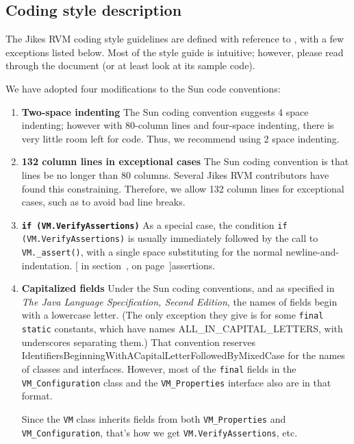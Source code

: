 \subsection{Coding style description}

The Jikes\TMweb{} RVM coding style guidelines are defined with
reference to ,
with a few exceptions listed below.  Most of the style guide is intuitive; 
however, please read through the document (or at least look at its sample code).

We have adopted four modifications to the Sun code conventions:
\begin{enumerate}
\item {\bf Two-space indenting} The Sun coding convention suggests 4
space indenting; however with 80-column lines and four-space indenting,
there is very little room left for code.  Thus, we recommend using 2
space indenting.

\item {\bf 132 column lines in exceptional cases} The Sun coding convention is
that lines be no longer than 80 columns.  Several Jikes RVM
contributors have found this constraining.  Therefore, we allow 132
column lines for exceptional cases, such as to avoid bad line breaks.

\item {\bf \tt if (VM.VerifyAssertions)}
As a special case, the condition {\tt if (VM.VerifyAssertions)} is
usually immediately followed by the call to {\tt VM.\_assert()},
with a single space substituting for the normal
newline-and-indentation.  [ in section~\Ref, on page~\Pageref]{assertions}.    

\item {\bf Capitalized fields} 
Under the Sun coding conventions, and as specified in 
{\em The Java Language Specification, Second Edition}, the names of
fields begin with a lowercase letter.  (The only exception they give
is for some {\tt final static} constants, which have names
ALL\-\_\-IN\-\_\-CA\-PI\-TAL\-\_\-LET\-TERS, with underscores separating them.)  That
convention reserves
IdentifiersBeginningWithACapitalLetterFollowedByMixedCase for the
names of classes and interfaces.  However, most of the {\tt final}
fields in the {\tt VM\_Configuration} class and the {\tt VM\_\-Pro\-per\-ties}
interface also are in that format.   

Since the {\tt VM} class inherits
fields from both {\tt VM\_Properties} and {\tt VM\_Configuration},
that's how we get {\tt VM.VerifyAssertions}, etc.
%

\end{enumerate}

